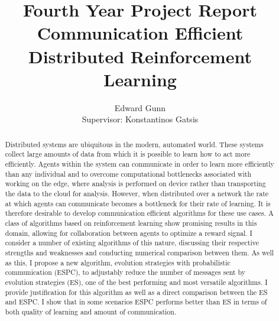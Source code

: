 \documentclass[letterpaper,11pt]{report}
\begin{document}
\title{Fourth Year Project Report \\ \textbf{Communication Efficient Distributed Reinforcement Learning}}
\author{Edward Gunn \\ Supervisor: Konstantinos Gatsis}
\maketitle 

\begin{abstract}
    Distributed systems are ubiquitous in the modern, automated world.
    These systems collect large amounts of data from which it is possible to learn how to act more efficiently.
    Agents within the system can communicate in order to learn more efficiently than any individual and to overcome computational bottlenecks associated with working on the edge, where analysis is performed on device rather than transporting the data to the cloud for analysis.
    However, when distributed over a network the rate at which agents can communicate becomes a bottleneck for their rate of learning.
    It is therefore desirable to develop communication efficient algorithms for these use cases. A class of algorithms based on reinforcement learning show promising results in this domain, allowing for collaboration between agents to optimize a reward signal. I consider a number of existing algorithms of this nature, discussing their respective strengths and weaknesses and conducting numerical comparison between them. As well as this, I propose a new algorithm, evolution strategies with probabilistic communication (ESPC), to adjustably reduce the number of messages sent by evolution strategies (ES), one of the best performing and most versatile algorithms. I provide justification for this algorithm as well as a direct comparison between the ES and ESPC. I show that in some scenarios ESPC performs better than ES in terms of both quality of learning and amount of communication.
\end{abstract}

\tableofcontents















% 
\end{document}
